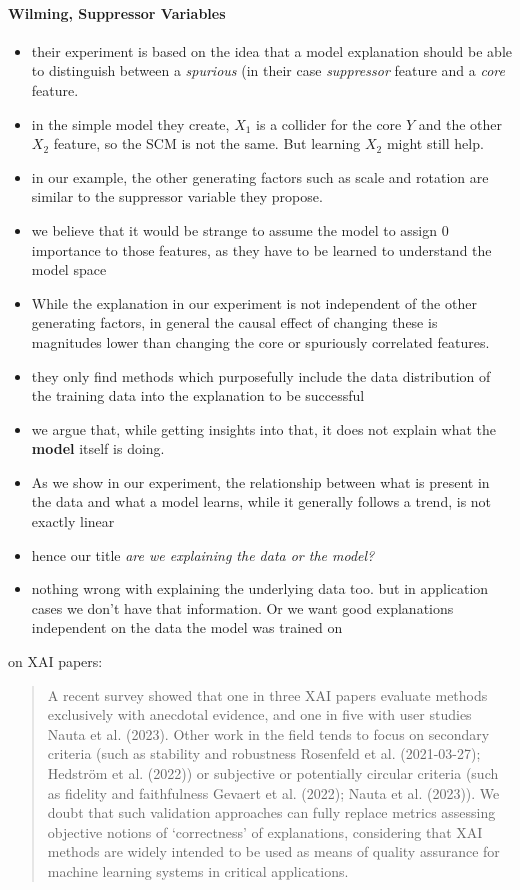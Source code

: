 \paragraph{Wilming, Suppressor Variables}
\cite{Wilming2023,Clark2023}
\begin{itemize}
    \item their experiment is based on the idea that a model explanation should be able to distinguish between a \textit{spurious} (in their case \textit{suppressor} feature and a \textit{core} feature. 
    \item in the simple model they create, $X_1$ is a collider for the core $Y$ and the other $X_2$ feature, so the SCM is not the same. But learning $X_2$ might still help.
    \item in our example, the other generating factors such as scale and rotation are similar to the suppressor variable they propose. 
    \item we believe that it would be strange to assume the model to assign 0 importance to those features, as they have to be learned to understand the model space
    \item While the explanation in our experiment is not independent of the other generating factors, in general the causal effect of changing these is magnitudes lower than changing the core or spuriously correlated features. 
    \item they only find methods which purposefully include the data distribution of the training data into the explanation to be successful
    \item we argue that, while getting insights into that, it does not explain what the \textbf{model} itself is doing.
    \item As we show in our experiment, the relationship between what is present in the data and what a model learns, while it generally follows a trend, is not exactly linear
    \item hence our title \textit{are we explaining the data or the model?}
    \item nothing wrong with explaining the underlying data too. but in application cases we don't have that information. Or we want good explanations independent on the data the model was trained on
\end{itemize}

\cite{Clark2023} on XAI papers: 
\begin{quote}
A recent survey showed that one in three XAI papers evaluate methods exclusively with anecdotal
evidence, and one in five with user studies Nauta et al. (2023). Other work in the field tends to
focus on secondary criteria (such as stability and robustness Rosenfeld et al. (2021-03-27); Hedström
et al. (2022)) or subjective or potentially circular criteria (such as fidelity and faithfulness Gevaert et al. (2022); Nauta et al. (2023)). We doubt that such validation approaches can fully replace metrics assessing objective notions of ‘correctness’ of explanations, considering that XAI methods are widely intended to be used as means of quality assurance for machine learning systems in critical applications.
\end{quote}

